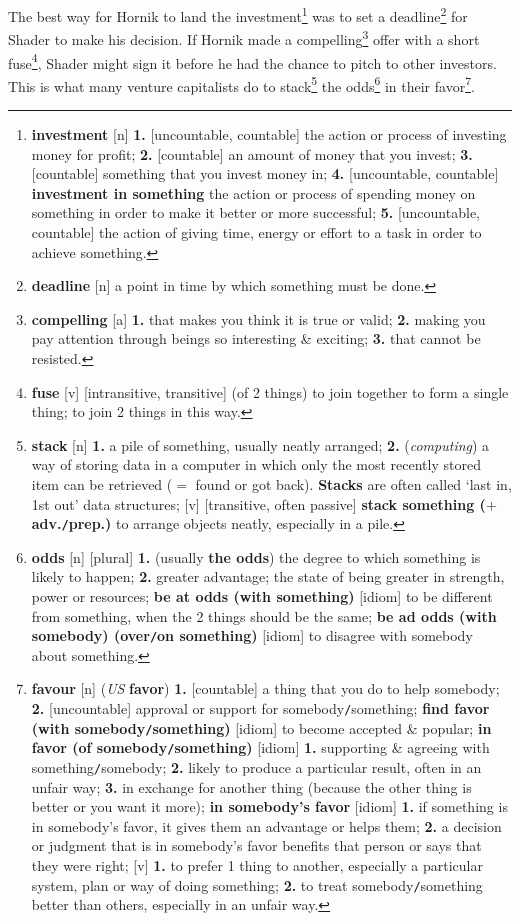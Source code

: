 \documentclass[oneside]{book}
\numberwithin{equation}{section}
\begin{document}
The best way for Hornik to land the investment\footnote{\textbf{investment} [n] \textbf{1.} [uncountable, countable] the action or process of investing money for profit; \textbf{2.} [countable] an amount of money that you invest; \textbf{3.} [countable] something that you invest money in; \textbf{4.} [uncountable, countable] \textbf{investment in something} the action or process of spending money on something in order to make it better or more successful; \textbf{5.} [uncountable, countable] the action of giving time, energy or effort to a task in order to achieve something.} was to set a deadline\footnote{\textbf{deadline} [n] a point in time by which something must be done.} for Shader to make his decision. If Hornik made a compelling\footnote{\textbf{compelling} [a] \textbf{1.} that makes you think it is true or valid; \textbf{2.} making you pay attention through beings so interesting \& exciting; \textbf{3.} that cannot be resisted.} offer with a short fuse\footnote{\textbf{fuse} [v] [intransitive, transitive] (of 2 things) to join together to form a single thing; to join 2 things in this way.}, Shader might sign it before he had the chance to pitch to other investors. This is what many venture capitalists do to stack\footnote{\textbf{stack} [n] \textbf{1.} a pile of something, usually neatly arranged; \textbf{2.} (\textit{computing}) a way of storing data in a computer in which only the most recently stored item can be retrieved ($=$ found or got back). \textbf{Stacks} are often called `last in, 1st out' data structures; [v] [transitive, often passive] \textbf{stack something ($+$ adv.\texttt{/}prep.)} to arrange objects neatly, especially in a pile.} the odds\footnote{\textbf{odds} [n] [plural] \textbf{1.} (usually \textbf{the odds}) the degree to which something is likely to happen; \textbf{2.} greater advantage; the state of being greater in strength, power or resources; \textbf{be at odds (with something)} [idiom] to be different from something, when the 2 things should be the same; \textbf{be ad odds (with somebody) (over\texttt{/}on something)} [idiom] to disagree with somebody about something.} in their favor\footnote{\textbf{favour} [n] (\textit{US} \textbf{favor}) \textbf{1.} [countable] a thing that you do to help somebody; \textbf{2.} [uncountable] approval or support for somebody\texttt{/}something; \textbf{find favor (with somebody\texttt{/}something)} [idiom] to become accepted \& popular; \textbf{in favor (of somebody\texttt{/}something)} [idiom] \textbf{1.} supporting \& agreeing with something\texttt{/}somebody; \textbf{2.} likely to produce a particular result, often in an unfair way; \textbf{3.} in exchange for another thing (because the other thing is better or you want it more); \textbf{in somebody's favor} [idiom] \textbf{1.} if something is in somebody's favor, it gives them an advantage or helps them; \textbf{2.} a decision or judgment that is in somebody's favor benefits that person or says that they were right; [v] \textbf{1.} to prefer 1 thing to another, especially a particular system, plan or way of doing something; \textbf{2.} to treat somebody\texttt{/}something better than others, especially in an unfair way.}.
\end{document}
